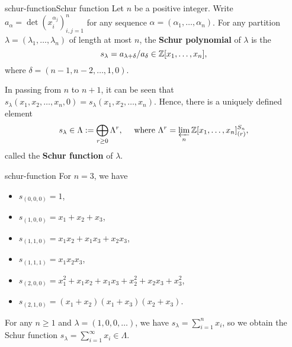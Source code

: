 \begin{topic}{schur-function}{Schur function}
    Let $n$ be a positive integer. Write $a_\alpha = \det(x_i^{\alpha_j})_{i, j = 1}^{n}$ for any sequence $\alpha = (\alpha_1, \ldots, \alpha_n)$. For any partition $\lambda = (\lambda_1, \ldots, \lambda_n)$ of length at most $n$, the \textbf{Schur polynomial} of $\lambda$ is the 
    \[ s_\lambda = a_{\lambda + \delta} / a_\delta \in \mathbb{Z}[x_1, \ldots, x_n] , \]
    where $\delta = (n - 1, n - 2, \ldots, 1, 0)$.
    
    In passing from $n$ to $n + 1$, it can be seen that $s_\lambda(x_1, x_2, \ldots, x_n, 0) = s_\lambda(x_1, x_2, \ldots, x_n)$. Hence, there is a uniquely defined element
    \[ s_\lambda \in \Lambda := \bigoplus_{r \ge 0} \Lambda^r , \quad \textup{ where  } \Lambda^r = \varprojlim_n \mathbb{Z}[x_1, \ldots, x_n]_{(r)}^{S_n} , \]
    called the \textbf{Schur function} of $\lambda$.
\end{topic}

\begin{example}{schur-function}
    For $n = 3$, we have
    \begin{itemize}
        \item $s_{(0, 0, 0)} = 1$,
        \item $s_{(1, 0, 0)} = x_1 + x_2 + x_3$,
        \item $s_{(1, 1, 0)} = x_1 x_2 + x_1 x_3 + x_2 x_3$,
        \item $s_{(1, 1, 1)} = x_1 x_2 x_3$,
        \item $s_{(2, 0, 0)} = x_1^2 + x_1 x_2 + x_1 x_3 + x_2^2 + x_2 x_3 + x_3^2$,
        \item $s_{(2, 1, 0)} = (x_1 + x_2) (x_1 + x_3) (x_2 + x_3)$.
    \end{itemize}
    For any $n \ge 1$ and $\lambda = (1, 0, 0, \ldots)$, we have $s_\lambda = \sum_{i = 1}^{n} x_i$, so we obtain the Schur function $s_\lambda = \sum_{i = 1}^{\infty} x_i \in \Lambda$.
\end{example}

    

